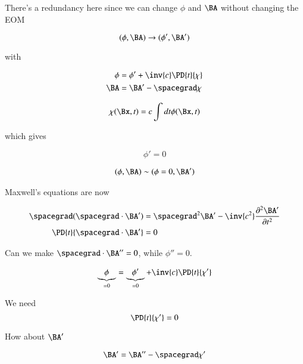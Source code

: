 There's a redundancy here since we can change $\phi$ and $\BA$ without changing the EOM

\begin{equation}\label{eqn:relativisticElectrodynamicsL14:50}
(\phi, \BA) \rightarrow (\phi', \BA')
\end{equation}

with

\begin{align}\label{eqn:relativisticElectrodynamicsL14:70}
\phi &= \phi' + \inv{c} \PD{t}{\chi} \\
\BA &= \BA' - \spacegrad \chi
\end{align}

\begin{equation}\label{eqn:relativisticElectrodynamicsL14:90}
\chi(\Bx, t) = c \int dt \phi(\Bx, t)
\end{equation}

which gives 

\begin{equation}\label{eqn:relativisticElectrodynamicsL14:110}
\phi' = 0
\end{equation}

\begin{align}\label{eqn:relativisticElectrodynamicsL14:130}
(\phi, \BA) \sim (\phi = 0, \BA')
\end{align}

Maxwell's equations are now

\begin{align*}
\spacegrad (\spacegrad \cdot \BA') &= \spacegrad^2 \BA'  - \inv{c^2} \frac{\partial^2 \BA'}{\partial t^2} \\
\PD{t}{\spacegrad \cdot \BA'}  &= 0
\end{align*}

Can we make $\spacegrad \cdot \BA'' = 0$, while $\phi'' = 0$.

\begin{align}\label{eqn:relativisticElectrodynamicsL14:150}
\underbrace{\phi}_{=0} &= \underbrace{\phi'}_{=0} + \inv{c} \PD{t}{\chi'} \\
\end{align}

We need 
\begin{equation}\label{eqn:relativisticElectrodynamicsL14:170}
\PD{t}{\chi'} = 0
\end{equation}

How about $\BA'$

\begin{equation}\label{eqn:relativisticElectrodynamicsL14:190}
\BA' = \BA'' - \spacegrad \chi'
\end{equation}

